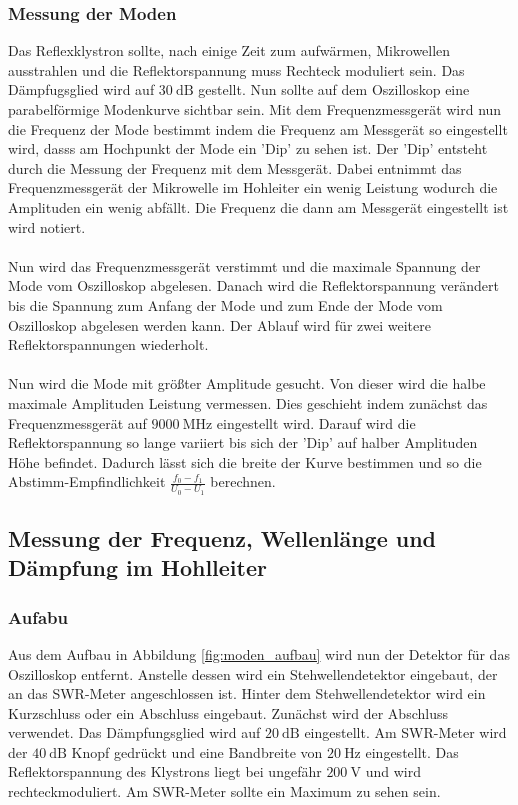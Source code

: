 \subsubsection{Messung der Moden}
\label{sec:moden_durchfuehrung}
Das Reflexklystron sollte, nach einige Zeit zum aufwärmen, Mikrowellen ausstrahlen und die Reflektorspannung muss Rechteck moduliert sein. Das Dämpfugsglied wird auf $\SI{30}{\dB}$ gestellt.
Nun sollte auf dem Oszilloskop eine parabelförmige Modenkurve sichtbar sein.
Mit dem Frequenzmessgerät wird nun die Frequenz der Mode bestimmt indem die Frequenz am Messgerät so eingestellt wird, dasss am Hochpunkt der Mode ein 'Dip' zu sehen ist.
Der 'Dip' entsteht durch die Messung der Frequenz mit dem Messgerät.
Dabei entnimmt das Frequenzmessgerät der Mikrowelle im Hohleiter ein wenig Leistung wodurch die Amplituden ein wenig abfällt.
Die Frequenz die dann am Messgerät eingestellt ist wird notiert.
\\\\
Nun wird das Frequenzmessgerät verstimmt und die maximale Spannung der Mode vom Oszilloskop abgelesen.
Danach wird die Reflektorspannung verändert bis die Spannung zum Anfang der Mode und zum Ende der Mode vom Oszilloskop abgelesen werden kann.
Der Ablauf wird für zwei weitere Reflektorspannungen wiederholt.
\\\\
Nun wird die Mode mit größter Amplitude gesucht.
Von dieser wird die halbe maximale Amplituden Leistung vermessen.
Dies geschieht indem zunächst das Frequenzmessgerät auf $\SI{9000}{\mega\Hz}$ eingestellt wird.
Darauf wird die Reflektorspannung so lange variiert bis sich der 'Dip' auf halber Amplituden Höhe befindet.
Dadurch lässt sich die breite der Kurve bestimmen und so die Abstimm-Empfindlichkeit $\frac{f_0 - f_1}{U_0 - U_1}$ berechnen.

\subsection{Messung der Frequenz, Wellenlänge und Dämpfung im Hohlleiter}
\subsubsection{Aufabu}
\label{sec:aufbau}
Aus dem Aufbau in Abbildung \ref{fig:moden_aufbau} wird nun der Detektor für das Oszilloskop entfernt.
Anstelle dessen wird ein Stehwellendetektor eingebaut, der an das SWR-Meter angeschlossen ist.
Hinter dem Stehwellendetektor wird ein Kurzschluss oder ein Abschluss eingebaut.
Zunächst wird der Abschluss verwendet.
Das Dämpfungsglied wird auf $\SI{20}{\dB}$ eingestellt.
Am SWR-Meter wird der $\SI{40}{\dB}$ Knopf gedrückt und eine Bandbreite von $\SI{20}{\Hz}$ eingestellt.
Das Reflektorspannung des Klystrons liegt bei ungefähr $\SI{200}{\V}$ und wird rechteckmoduliert.
Am SWR-Meter sollte ein Maximum zu sehen sein.

